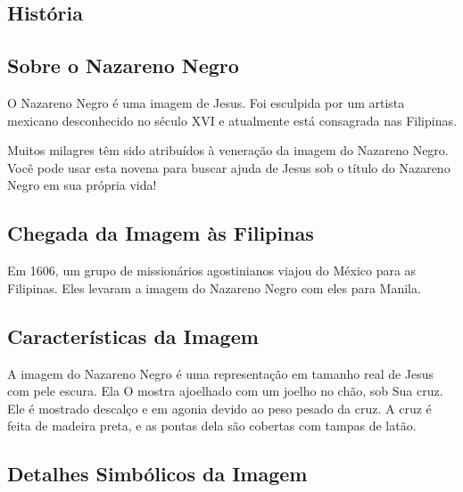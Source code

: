 \documentclass[18pt]{article}
\begin{document}
\begin{justify}

 \begin{center}
  \section{História}\label{sec:História} %
 \end{center}


\subsection{Sobre o Nazareno Negro}\label{sub:Sobre o Nazareno Negro} %
 
\hspace{.45cm} O Nazareno Negro é uma imagem de Jesus. Foi esculpida por um artista mexicano desconhecido no século XVI e atualmente está consagrada nas Filipinas.

Muitos milagres têm sido atribuídos à veneração da imagem do Nazareno Negro. Você pode usar esta novena para buscar ajuda de Jesus sob o título do Nazareno Negro em sua própria vida!



\subsection{Chegada da Imagem às Filipinas}

\hspace{.45cm} Em 1606, um grupo de missionários agostinianos viajou do México para as Filipinas. Eles levaram a imagem do Nazareno Negro com eles para Manila.


\subsection{Características da Imagem}

\hspace{.45cm} A imagem do Nazareno Negro é uma representação em tamanho real de Jesus com pele escura. Ela O mostra ajoelhado com um joelho no chão, sob Sua cruz. Ele é mostrado descalço e em agonia devido ao peso pesado da cruz. A cruz é feita de madeira preta, e as pontas dela são cobertas com tampas de latão.


\subsection{Detalhes Simbólicos da Imagem}


\end{justify}
\end{document}
